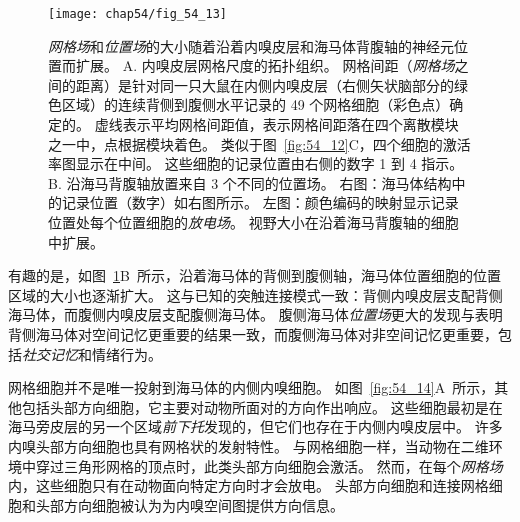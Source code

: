 \begin{figure}[htbp]
	\centering
	\texttt{[image: chap54/fig\_54\_13]}
	\caption{\textit{网格场}和\textit{位置场}的大小随着沿着内嗅皮层和海马体背腹轴的神经元位置而扩展。
		A. 内嗅皮层网格尺度的拓扑组织。
		网格间距（\textit{网格场}之间的距离）是针对同一只大鼠在内侧内嗅皮层（右侧矢状脑部分的绿色区域）的连续背侧到腹侧水平记录的 49 个网格细胞（彩色点）确定的。
		虚线表示平均网格间距值，表示网格间距落在四个离散模块之一中，点根据模块着色。
		类似于图~\ref{fig:54_12}C，四个细胞的激活率图显示在中间。
		这些细胞的记录位置由右侧的数字 1 到 4 指示\cite{stensola2012entorhinal}。
		B. 沿海马背腹轴放置来自 3 个不同的位置场。
		右图：海马体结构中的记录位置（数字）如右图所示。
		左图：颜色编码的映射显示记录位置处每个位置细胞的\textit{放电场}。
		视野大小在沿着海马背腹轴的细胞中扩展\cite{kjelstrup2008finite}。}
	\label{fig:54_13}
\end{figure}


有趣的是，如图~\ref{fig:54_13}B~所示，沿着海马体的背侧到腹侧轴，海马体位置细胞的位置区域的大小也逐渐扩大。
这与已知的突触连接模式一致：背侧内嗅皮层支配背侧海马体，而腹侧内嗅皮层支配腹侧海马体。
腹侧海马体\textit{位置场}更大的发现与表明背侧海马体对空间记忆更重要的结果一致，而腹侧海马体对非空间记忆更重要，包括\textit{社交记忆}和情绪行为。


网格细胞并不是唯一投射到海马体的内侧内嗅细胞。
如图~\ref{fig:54_14}A~所示，其他包括头部方向细胞，它主要对动物所面对的方向作出响应。
这些细胞最初是在海马旁皮层的另一个区域\textit{前下托}发现的，但它们也存在于内侧内嗅皮层中。
许多内嗅头部方向细胞也具有网格状的发射特性。
与网格细胞一样，当动物在二维环境中穿过三角形网格的顶点时，此类头部方向细胞会激活。
然而，在每个\textit{网格场}内，这些细胞只有在动物面向特定方向时才会放电。
头部方向细胞和连接网格细胞和头部方向细胞被认为为内嗅空间图提供方向信息。



